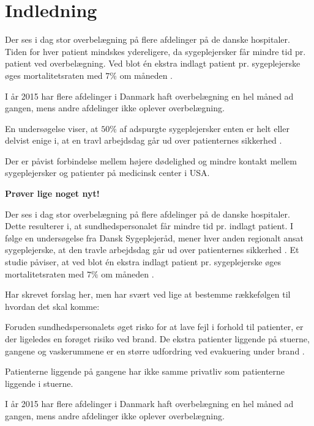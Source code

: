 \chapter{Indledning}
Der ses i dag stor overbelægning på flere afdelinger på de danske hospitaler. Tiden for hver patient mindskes ydereligere, da sygeplejersker får mindre tid pr. patient ved overbelægning.\cite{SDS2015} Ved blot én ekstra indlagt patient pr. sygeplejerske øges mortalitetsraten med $7 \%$ om måneden \cite{Aiken2014}.


I år 2015 har flere afdelinger i Danmark haft overbelægning en hel måned ad gangen, mens andre afdelinger ikke oplever overbelægning.\cite{SDS2015}


  En undersøgelse viser, at $50 \%$ af adspurgte sygeplejersker enten er helt eller delvist enige i, at en travl arbejdsdag går ud over patienternes sikkerhed \cite{Kjeldsen2015}.

 Der er påvist forbindelse mellem højere dødelighed og mindre kontakt mellem sygeplejersker og patienter på medicinsk center i USA.\cite{Madsen2014}



\textbf{Prøver lige noget nyt!}

Der ses i dag stor overbelægning på flere afdelinger på de danske hospitaler. Dette resulterer i, at sundhedspersonalet får mindre tid pr. indlagt patient. I følge en undersøgelse fra Dansk Sygeplejeråd, mener hver anden regionalt ansat sygeplejerske, at den travle arbejdsdag går ud over patienternes sikkerhed \cite{Kjeldsen2015}. Et studie påviser, at ved blot én ekstra indlagt patient pr. sygeplejerske øges mortalitetsraten med $7 \%$ om måneden  \cite{Aiken2014}. 


Har skrevet forslag her, men har svært ved lige at bestemme rækkefølgen til hvordan det skal komme:

Foruden sundhedspersonalets øget risko for at lave fejl i forhold til patienter, er der ligeledes en forøget risiko ved brand. De ekstra patienter liggende på stuerne, gangene og vaskerummene er en større udfordring ved evakuering under brand \citep{Madsen2014}. 

Patienterne liggende på gangene har ikke samme privatliv som patienterne liggende i stuerne.\cite{Madsen2014}

I år 2015 har flere afdelinger i Danmark haft overbelægning en hel måned ad gangen, mens andre afdelinger ikke oplever overbelægning.\cite{2015}